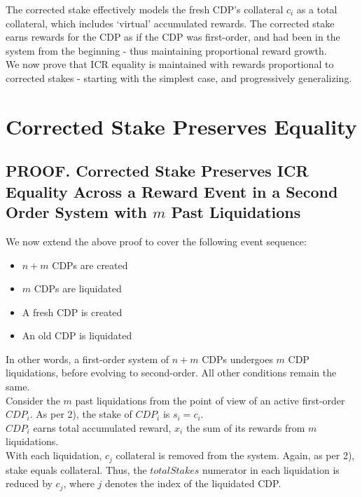 \documentclass[reqno]{article}
\begin{document}
The corrected stake effectively models the fresh CDP’s collateral $c_i$ as a total collateral, which includes ‘virtual’ accumulated rewards. The corrected stake earns rewards for the CDP as if the CDP was first-order, and had been in the system from the beginning - thus maintaining proportional reward growth.\\

We now prove that ICR equality is maintained with rewards proportional to corrected stakes - starting with the simplest case, and progressively generalizing.

\section{Corrected Stake Preserves Equality}

\subsection{PROOF. Corrected Stake Preserves ICR Equality Across a Reward Event in a Second Order System with $m$ Past Liquidations}

We now extend the above proof to cover the following event sequence:

\begin{itemize}
  \item $n+m$ CDPs are created
  \item $m$ CDPs are liquidated
  \item A fresh CDP is created
  \item An old CDP is liquidated
\end{itemize}

\bigskip
In other words, a first-order system of $n+m$ CDPs undergoes $m$ CDP liquidations, before evolving to second-order.  All other conditions remain the same.\\

Consider the $m$ past liquidations from the point of view of an active first-order $CDP_i$. As per 2), the stake of $CDP_i$ is $s_i = c_i$.\\

$CDP_i$ earns total accumulated reward, $x_i$  the sum of its rewards from $m$ liquidations.\\

With each liquidation, $c_j$ collateral is removed from the system. Again, as per 2), stake equals collateral. Thus, the $totalStakes$ numerator in each liquidation is reduced by $c_j$, where $j$ denotes the index of the liquidated CDP.\\ 
\end{document}
